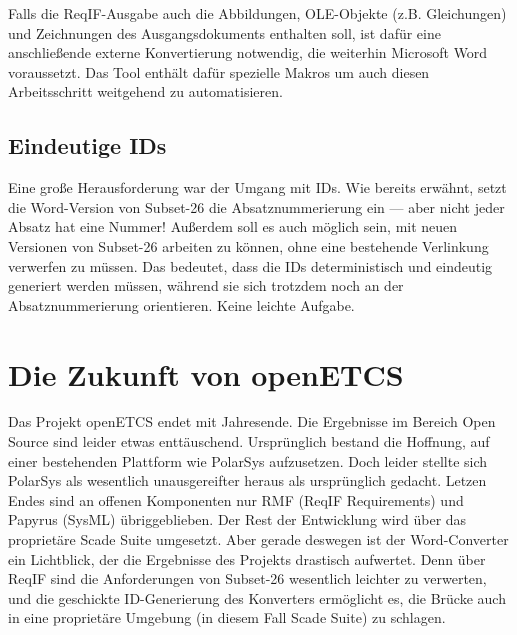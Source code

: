 \documentclass[twoside]{article}
\begin{document}
\begin{multicols}{2}
Falls die ReqIF-Ausgabe auch die Abbildungen, OLE-Objekte (z.B. Gleichungen) und Zeichnungen des Ausgangsdokuments enthalten soll, ist dafür eine anschließende externe Konvertierung notwendig, die weiterhin Microsoft Word voraussetzt. Das Tool enthält dafür spezielle Makros um auch diesen Arbeitsschritt weitgehend zu automatisieren.


\subsection{Eindeutige IDs}

Eine große Herausforderung war der Umgang mit IDs. Wie bereits erwähnt, setzt die Word-Version von Subset-26 die Absatznummerierung ein --- aber nicht jeder Absatz hat eine Nummer!  Außerdem soll es auch möglich sein, mit neuen Versionen von Subset-26 arbeiten zu können, ohne eine bestehende Verlinkung verwerfen zu müssen.  Das bedeutet, dass die IDs deterministisch und eindeutig generiert werden müssen, während sie sich trotzdem noch an der Absatznummerierung orientieren.  Keine leichte Aufgabe.

\section{Die Zukunft von openETCS}

Das Projekt openETCS endet mit Jahresende.  Die Ergebnisse im Bereich Open Source sind leider etwas enttäuschend.  Ursprünglich bestand die Hoffnung, auf einer bestehenden Plattform wie PolarSys aufzusetzen.  Doch leider stellte sich PolarSys als wesentlich unausgereifter heraus als ursprünglich gedacht.  Letzen Endes sind an offenen Komponenten nur RMF (ReqIF Requirements) und Papyrus (SysML) übriggeblieben.  Der Rest der Entwicklung wird über das proprietäre Scade Suite umgesetzt.  Aber gerade deswegen ist der Word-Converter ein Lichtblick, der die Ergebnisse des Projekts drastisch aufwertet. Denn über ReqIF sind die Anforderungen von Subset-26 wesentlich leichter zu verwerten, und die geschickte ID-Generierung des Konverters ermöglicht es, die Brücke auch in eine proprietäre Umgebung (in diesem Fall Scade Suite) zu schlagen.


\end{multicols}
\end{document}
